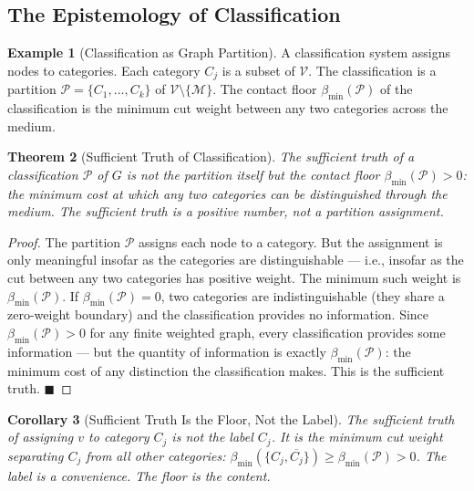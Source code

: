 \documentclass[12pt, a4paper]{article}
\theoremstyle{plain}
\newtheorem{theorem}{Theorem}[section]
\newtheorem{corollary}[theorem]{Corollary}
\theoremstyle{definition}
\newtheorem{example}[theorem]{Example}
\theoremstyle{remark}
\newcommand{\med}{\mathcal{M}}
\newcommand{\Pcal}{\mathcal{P}}
\newcommand{\Vcal}{\mathcal{V}}
\newcommand{\bmin}{\beta_{\min}}
\newcommand{\qed}{\hfill$\blacksquare$}
\begin{document}
\subsection{The Epistemology of Classification}

\begin{example}[Classification as Graph Partition]
\label{ex:classification}
A classification system assigns nodes to categories. Each category $C_j$
is a subset of $\Vcal$. The classification is a partition $\Pcal =
\{C_1, \ldots, C_k\}$ of $\Vcal \setminus \{\med\}$. The contact floor
$\bmin(\Pcal)$ of the classification is the minimum cut weight between any
two categories across the medium.
\end{example}

\begin{theorem}[Sufficient Truth of Classification]
\label{thm:classification_truth}
The sufficient truth of a classification $\Pcal$ of $G$ is not the partition
itself but the contact floor $\bmin(\Pcal) > 0$: the minimum cost at which
any two categories can be distinguished through the medium. The sufficient
truth is a positive number, not a partition assignment.
\end{theorem}

\begin{proof}
The partition $\Pcal$ assigns each node to a category. But the assignment
is only meaningful insofar as the categories are distinguishable --- i.e.,
insofar as the cut between any two categories has positive weight. The
minimum such weight is $\bmin(\Pcal)$. If $\bmin(\Pcal) = 0$, two categories
are indistinguishable (they share a zero-weight boundary) and the classification
provides no information. Since $\bmin(\Pcal) > 0$ for any finite weighted
graph, every classification provides some information --- but the quantity of
information is exactly $\bmin(\Pcal)$: the minimum cost of any distinction
the classification makes. This is the sufficient truth. \qed
\end{proof}

\begin{corollary}[Sufficient Truth Is the Floor, Not the Label]
\label{cor:sufficient_truth}
The sufficient truth of assigning $v$ to category $C_j$ is not the label
$C_j$. It is the minimum cut weight separating $C_j$ from all other
categories: $\bmin(\{C_j, \overline{C_j}\}) \geq \bmin(\Pcal) > 0$.
The label is a convenience. The floor is the content.
\end{corollary}

\end{document}
